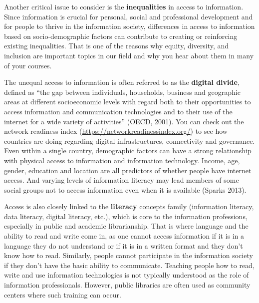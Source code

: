 \documentclass[
  letterpaper,
  DIV=11,
  numbers=noendperiod]{scrreprt}
\begin{document}
Another critical issue to consider is the \textbf{inequalities} in
access to information. Since information is crucial for personal, social
and professional development and for people to thrive in the information
society, differences in access to information based on socio-demographic
factors can contribute to creating or reinforcing existing inequalities.
That is one of the reasons why equity, diversity, and inclusion are
important topics in our field and why you hear about them in many of
your courses.

The unequal access to information is often referred to as the
\textbf{digital divide}, defined as ``the gap between individuals,
households, business and geographic areas at different socioeconomic
levels with regard both to their opportunities to access information and
communication technologies and to their use of the internet for a wide
variety of activities'' (OECD, 2001). You can check out the network
readiness index (\url{https://networkreadinessindex.org/}) to see how
countries are doing regarding digital infrastructures, connectivity and
governance. Even within a single country, demographic factors can have a
strong relationship with physical access to information and information
technology. Income, age, gender, education and location are all
predictors of whether people have internet access. And varying levels of
information literacy may lead members of some social groups not to
access information even when it is available (Sparks 2013).

Access is also closely linked to the \textbf{literacy} concepts family
(information literacy, data literacy, digital literacy, etc.), which is
core to the information professions, especially in public and academic
librarianship. That is where language and the ability to read and write
come in, as one cannot access information if it is in a language they do
not understand or if it is in a written format and they don't know how
to read. Similarly, people cannot participate in the information society
if they don't have the basic ability to communicate. Teaching people how
to read, write and use information technologies is not typically
understood as the role of information professionals. However, public
libraries are often used as community centers where such training can
occur.
\end{document}
